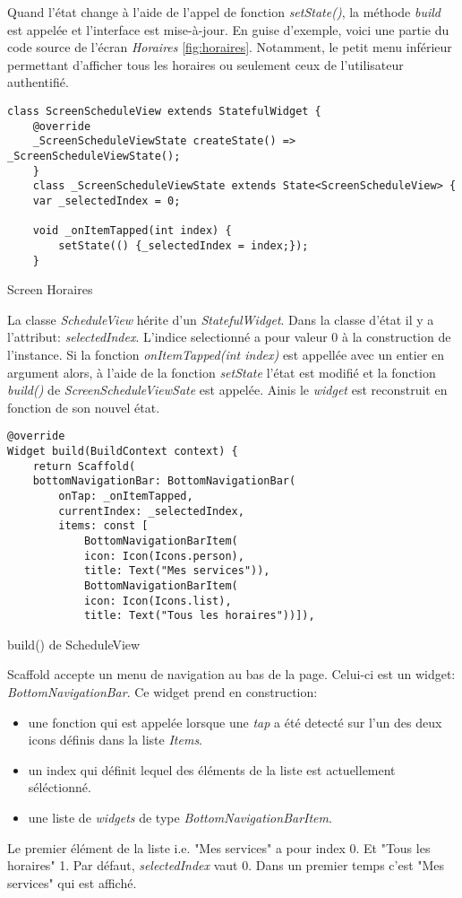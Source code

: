 Quand l'état change à l'aide de l'appel de fonction \textit{setState()}, la méthode \textit{build} est appelée et l'interface est mise-à-jour. En guise d'exemple, voici une partie du code source
de l'écran \textit{Horaires} \ref{fig:horaires}. Notamment, le petit menu inférieur permettant d'afficher tous les horaires ou seulement ceux de l'utilisateur authentifié.
\begin{listing}[h]
    \begin{verbatim}
class ScreenScheduleView extends StatefulWidget {
    @override
    _ScreenScheduleViewState createState() => _ScreenScheduleViewState();
    }
    class _ScreenScheduleViewState extends State<ScreenScheduleView> {
    var _selectedIndex = 0;
    
    void _onItemTapped(int index) {
        setState(() {_selectedIndex = index;});
    }
        \end{verbatim}
    \caption{Screen Horaires}
    \label{code:screenHoraires}
\end{listing}

La classe \textit{ScheduleView} hérite d'un \textit{StatefulWidget}. Dans la classe d'état il y a l'attribut: \textit{selectedIndex}. L'indice selectionné a pour valeur 0 à la construction de l'instance.
Si la fonction \textit{onItemTapped(int index)} est appellée avec un entier en argument alors, à l'aide de la fonction \textit{setState} l'état est modifié
et la fonction \textit{build()} de \textit{ScreenScheduleViewSate} est appelée. Ainis le \textit{widget} est reconstruit en fonction de son nouvel état.

\begin{listing}[h]
    \begin{verbatim}
@override
Widget build(BuildContext context) {
    return Scaffold(
    bottomNavigationBar: BottomNavigationBar(
        onTap: _onItemTapped,
        currentIndex: _selectedIndex,
        items: const [
            BottomNavigationBarItem(
            icon: Icon(Icons.person),
            title: Text("Mes services")),
            BottomNavigationBarItem(
            icon: Icon(Icons.list),
            title: Text("Tous les horaires"))]),
        \end{verbatim}
    \caption{build() de ScheduleView}
    \label{code:buildHoraire}
\end{listing}

Scaffold accepte un menu de navigation au bas de la page. Celui-ci est un widget: \textit{BottomNavigationBar}. Ce widget prend en construction:
\begin{itemize}
    \item une fonction qui est appelée lorsque une \textit{tap} a été detecté sur l'un des deux icons définis dans la liste \textit{Items}.
    \item un index qui définit lequel des éléments de la liste est actuellement séléctionné.
    \item une liste de \textit{widgets} de type \textit{BottomNavigationBarItem}.
\end{itemize}
Le premier élément de la liste i.e. "Mes services" a pour index 0. Et "Tous les horaires" 1. Par défaut, \textit{selectedIndex} vaut 0. Dans un premier temps c'est "Mes services" qui est affiché.

